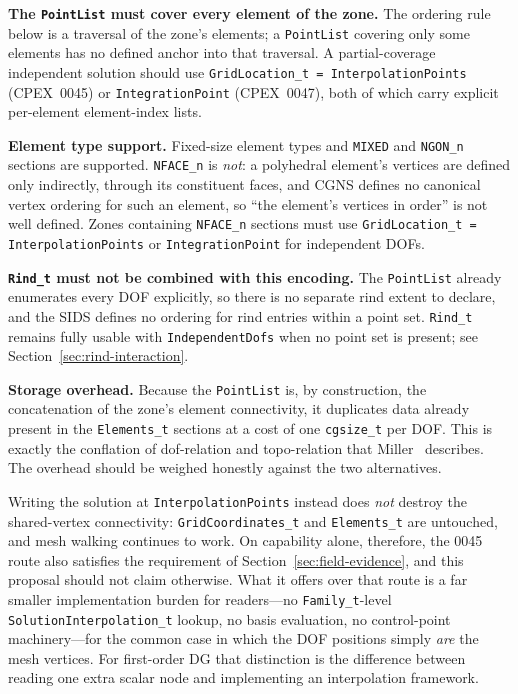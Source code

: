 \documentclass[11pt,letterpaper]{article}
\begin{document}
\textbf{The \texttt{PointList} must cover every element of the zone.}
The ordering rule below is a traversal of the zone's elements; a
\texttt{PointList} covering only some elements has no defined anchor
into that traversal.  A partial-coverage independent solution should
use \texttt{GridLocation\_t = InterpolationPoints} (CPEX~0045) or
\texttt{IntegrationPoint} (CPEX~0047), both of which carry explicit
per-element element-index lists.

\textbf{Element type support.}  Fixed-size element types and
\texttt{MIXED} and \texttt{NGON\_n} sections are supported.
\texttt{NFACE\_n} is \emph{not}: a polyhedral element's vertices are
defined only indirectly, through its constituent faces, and CGNS
defines no canonical vertex ordering for such an element, so ``the
element's vertices in order'' is not well defined.  Zones containing
\texttt{NFACE\_n} sections must use
\texttt{GridLocation\_t = InterpolationPoints} or
\texttt{IntegrationPoint} for independent DOFs.

\textbf{\texttt{Rind\_t} must not be combined with this encoding.}
The \texttt{PointList} already enumerates every DOF explicitly, so
there is no separate rind extent to declare, and the SIDS defines no
ordering for rind entries within a point set.  \texttt{Rind\_t}
remains fully usable with \texttt{IndependentDofs} when no
point set is present; see Section~\ref{sec:rind-interaction}.

\textbf{Storage overhead.}  Because the \texttt{PointList} is, by
construction, the concatenation of the zone's element connectivity, it
duplicates data already present in the \texttt{Elements\_t} sections at
a cost of one \texttt{cgsize\_t} per DOF.  This is exactly the
conflation of dof-relation and topo-relation that
Miller~\cite{miller2003} describes.  The overhead should be weighed
honestly against the two alternatives.

Writing the solution at \texttt{InterpolationPoints} instead does
\emph{not} destroy the shared-vertex connectivity:
\texttt{GridCoordinates\_t} and \texttt{Elements\_t} are untouched, and
mesh walking continues to work.  On capability alone, therefore, the
0045 route also satisfies the requirement of
Section~\ref{sec:field-evidence}, and this proposal should not claim
otherwise.  What it offers over that route is a far smaller
implementation burden for readers---no \texttt{Family\_t}-level
\texttt{SolutionInterpolation\_t} lookup, no basis evaluation, no
control-point machinery---for the common case in which the DOF
positions simply \emph{are} the mesh vertices.  For first-order DG that
distinction is the difference between reading one extra scalar node and
implementing an interpolation framework.
\end{document}
